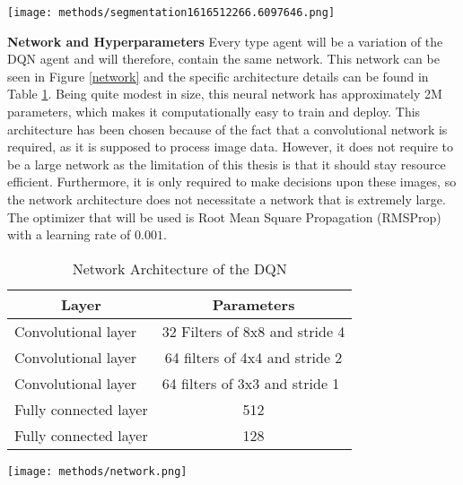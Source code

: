 \begin{Figure}
    \centering
    \texttt{[image: methods/segmentation1616512266.6097646.png]}
    \label{segmentationmap}
\end{Figure}

\noindent
\textbf{Network and Hyperparameters} \newline
Every type agent will be a variation of the DQN agent and will therefore, contain the same 
network. This network can be seen in Figure \ref{network} and the specific 
architecture details can be found in Table \ref{tab:NetworkArch}. Being quite modest 
in size, this neural network has approximately 2M parameters, 
which makes it computationally easy to train and deploy. 
This architecture has been chosen because of the fact that a convolutional network is required, as 
it is supposed to process image data. However, it does not require to be a large network as the 
limitation of this thesis is that it should stay resource efficient. Furthermore, it is only required 
to make decisions upon these images, so the network architecture does not necessitate a network 
that is extremely large. The optimizer that will be used is Root Mean Square Propagation 
(RMSProp) \cite{rmsprop} with a learning rate of $0.001$. \newline

\begin{table}[h]
    \centering
    \caption{Network Architecture of the DQN}
    \label{tab:NetworkArch}
    \begin{tabular}{l|c}
    \multicolumn{1}{c|}{\textbf{Layer}} & \textbf{Parameters}                                \\ \hline
    Convolutional layer                 & 32 Filters of 8x8 and stride 4                     \\
    Convolutional layer                 & 64 filters of 4x4 and stride 2                     \\
    Convolutional layer                 & \multicolumn{1}{l}{64 filters of 3x3 and stride 1} \\
    Fully connected layer               & 512                                                \\
    Fully connected layer               & 128                                               
    \end{tabular}
\end{table}


\begin{Figure}
    \centering
    \texttt{[image: methods/network.png]}
    \label{network}
\end{Figure}

